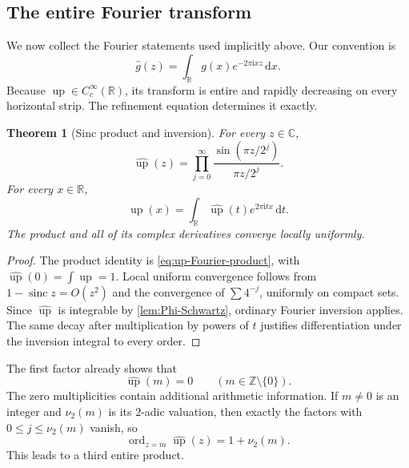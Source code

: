 \documentclass[11pt,oneside]{article}
\newtheorem{theorem}{Theorem}[section]
\theoremstyle{definition}
\theoremstyle{remark}
\newcommand{\upf}{\operatorname{up}}
\newcommand{\sinc}{\operatorname{sinc}}
\newcommand{\ord}{\operatorname{ord}}
\newcommand{\dd}{\,\mathrm d}
\newcommand{\ii}{\mathrm i}
\newcommand{\Z}{\mathbb Z}
\newcommand{\R}{\mathbb R}
\newcommand{\C}{\mathbb C}
\newcommand{\Fourier}{\widehat{\upf}}
\begin{document}
\subsection{The entire Fourier transform}

We now collect the Fourier statements used implicitly above.  Our convention is
\begin{equation}\label{eq:Fourier-convention}
  \widehat g(z)=\int_{\R}g(x)e^{-2\pi\ii xz}\dd x.
\end{equation}
Because $\upf\in C_c^\infty(\R)$, its transform is entire and rapidly decreasing
on every horizontal strip.  The refinement equation determines it exactly.

\begin{theorem}[Sinc product and inversion]\label{thm:Fourier-product-inversion}
For every $z\in\C$,
\begin{equation}\label{eq:Fourier-product-main}
  \Fourier(z)=\prod_{j=0}^{\infty}
  \frac{\sin(\pi z/2^j)}{\pi z/2^j}.
\end{equation}
For every $x\in\R$,
\begin{equation}\label{eq:Fourier-inversion-main}
  \upf(x)=\int_{\R}\Fourier(t)e^{2\pi\ii tx}\dd t.
\end{equation}
The product and all of its complex derivatives converge locally uniformly.
\end{theorem}

\begin{proof}
The product identity is \eqref{eq:up-Fourier-product}, with
$\widehat{\upf}(0)=\int\upf=1$.  Local uniform convergence follows from
$1-\sinc z=O(z^2)$ and the convergence of $\sum4^{-j}$, uniformly on compact
sets.  Since $\Fourier$ is integrable by \cref{lem:Phi-Schwartz}, ordinary Fourier
inversion applies.  The same decay after multiplication by powers of $t$ justifies
differentiation under the inversion integral to every order.
\end{proof}

The first factor already shows that
\begin{equation}\label{eq:integer-zeros}
  \Fourier(m)=0\qquad(m\in\Z\setminus\{0\}).
\end{equation}
The zero multiplicities contain additional arithmetic information.  If
$m\ne0$ is an integer and $\nu_2(m)$ is its $2$-adic valuation, then exactly the
factors with $0\le j\le\nu_2(m)$ vanish, so
\begin{equation}\label{eq:Fourier-zero-order}
  \ord_{z=m}\Fourier(z)=1+\nu_2(m).
\end{equation}
This leads to a third entire product.
\end{document}

